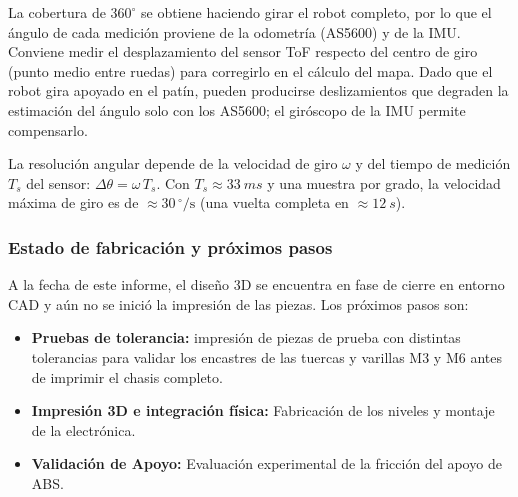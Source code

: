 \begin{visar}
La cobertura de $360^\circ$ se obtiene haciendo girar el robot completo, por lo que el ángulo de cada medición proviene de la odometría (AS5600) y de la IMU. Conviene medir el desplazamiento del sensor ToF respecto del centro de giro (punto medio entre ruedas) para corregirlo en el cálculo del mapa. Dado que el robot gira apoyado en el patín, pueden producirse deslizamientos que degraden la estimación del ángulo solo con los AS5600; el giróscopo de la IMU permite compensarlo.

La resolución angular depende de la velocidad de giro $\omega$ y del tiempo de medición $T_s$ del sensor: $\Delta\theta = \omega\,T_s$. Con $T_s \approx \SI{33}{ms}$ y una muestra por grado, la velocidad máxima de giro es de $\approx 30\,^\circ/\mathrm{s}$ (una vuelta completa en $\approx\SI{12}{s}$).
\end{visar}


\subsubsection{Estado de fabricación y próximos pasos}
A la fecha de este informe, el diseño 3D se encuentra en fase de cierre en entorno CAD y aún no se inició la impresión de las piezas. Los próximos pasos son:
\begin{itemize}[nosep]
    \item \textbf{Pruebas de tolerancia:} impresión de piezas de prueba con distintas tolerancias para validar los encastres de las tuercas y varillas M3 y M6 antes de imprimir el chasis completo.
    \item \textbf{Impresión 3D e integración física:} Fabricación de los niveles y montaje de la electrónica.
    \item \textbf{Validación de Apoyo:} Evaluación experimental de la fricción del apoyo de ABS.
\end{itemize}

